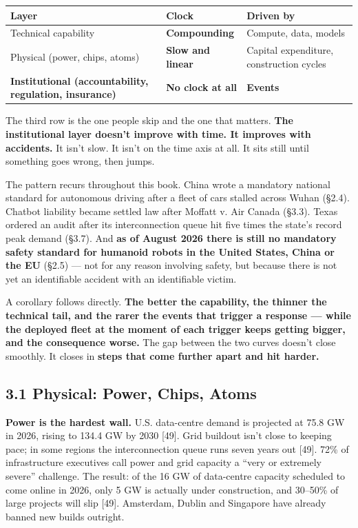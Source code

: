 \documentclass[11pt,a4paper]{article}
\begin{document}
\begin{center}

\begin{tabularx}{\textwidth}{lXX}
\toprule
Layer & Clock & Driven by \\
\midrule
Technical capability & \textbf{Compounding} & Compute, data, models \\
Physical (power, chips, atoms) & \textbf{Slow and linear} & Capital expenditure, construction cycles \\
\textbf{Institutional (accountability, regulation, insurance)} & \textbf{No clock at all} & \textbf{Events} \\
\bottomrule
\end{tabularx}
\end{center}

The third row is the one people skip and the one that matters. \textbf{The institutional layer doesn't improve with time. It improves with accidents.} It isn't slow. It isn't on the time axis at all. It sits still until something goes wrong, then jumps.

The pattern recurs throughout this book. China wrote a mandatory national standard for autonomous driving after a fleet of cars stalled across Wuhan (\S{}2.4). Chatbot liability became settled law after Moffatt v. Air Canada (\S{}3.3). Texas ordered an audit after its interconnection queue hit five times the state's record peak demand (\S{}3.7). And \textbf{as of August 2026 there is still no mandatory safety standard for humanoid robots in the United States, China or the EU} (\S{}2.5) --- not for any reason involving safety, but because there is not yet an identifiable accident with an identifiable victim.

A corollary follows directly. \textbf{The better the capability, the thinner the technical tail, and the rarer the events that trigger a response --- while the deployed fleet at the moment of each trigger keeps getting bigger, and the consequence worse.} The gap between the two curves doesn't close smoothly. It closes in \textbf{steps that come further apart and hit harder.}

\subsection{3.1 Physical: Power, Chips, Atoms}

\textbf{Power is the hardest wall.} U.S. data-centre demand is projected at 75.8 GW in 2026, rising to 134.4 GW by 2030 [49]. Grid buildout isn't close to keeping pace; in some regions the interconnection queue runs seven years out [49]. 72\% of infrastructure executives call power and grid capacity a ``very or extremely severe'' challenge. The result: of the 16 GW of data-centre capacity scheduled to come online in 2026, only 5 GW is actually under construction, and 30--50\% of large projects will slip [49]. Amsterdam, Dublin and Singapore have already banned new builds outright.
\end{document}
